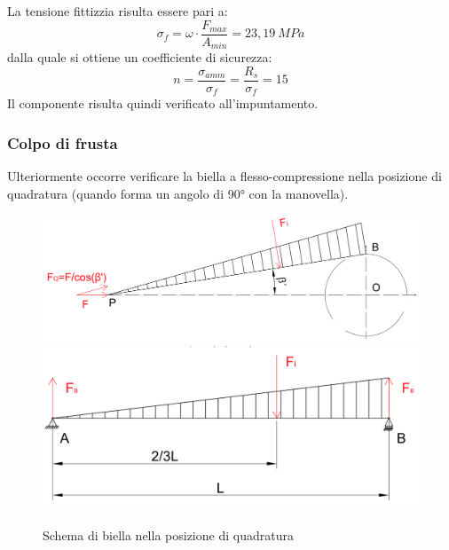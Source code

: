 La tensione fittizzia risulta essere pari a:
\begin{equation}
    \sigma_f=\omega\cdot \frac{F_{max}}{A_{min}}=23,19\ MPa
\end{equation}
dalla quale si ottiene un coefficiente di sicurezza:
\begin{equation}
    n=\frac{\sigma_{amm}}{\sigma_{f}}=\frac{R_s}{\sigma_{f}}=15
\end{equation}
Il componente risulta quindi verificato all'impuntamento.
\subsubsection{Colpo di frusta}
Ulteriormente occorre verificare la biella a flesso-compressione nella posizione di quadratura (quando forma un angolo di 90° con la manovella).
\begin{figure}[h]
    \centering
    \includegraphics[scale=0.35]{Immagini/QuadraturaBiella1.png}
    \includegraphics[scale=0.35]{Immagini/QuadraturaBiella2.png}
    \caption{Schema di biella nella posizione di quadratura}
    \label{fig:QuadraturaBiella}
\end{figure}


